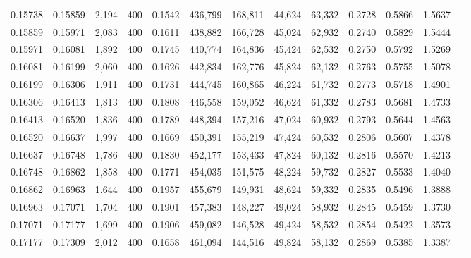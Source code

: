 \begin{tabular}{rrrrrrrrrrrrr}
0.15738 & 0.15859 &  2,194 & 400 &                                     0.1542 & 436,799 & 168,811 &  44,624 &  63,332 & 0.2728 & 0.5866 & 1.5637 \\
0.15859 & 0.15971 &  2,083 & 400 &                                     0.1611 & 438,882 & 166,728 &  45,024 &  62,932 & 0.2740 & 0.5829 & 1.5444 \\
0.15971 & 0.16081 &  1,892 & 400 &                                     0.1745 & 440,774 & 164,836 &  45,424 &  62,532 & 0.2750 & 0.5792 & 1.5269 \\
0.16081 & 0.16199 &  2,060 & 400 &                                     0.1626 & 442,834 & 162,776 &  45,824 &  62,132 & 0.2763 & 0.5755 & 1.5078 \\
0.16199 & 0.16306 &  1,911 & 400 &                                     0.1731 & 444,745 & 160,865 &  46,224 &  61,732 & 0.2773 & 0.5718 & 1.4901 \\
0.16306 & 0.16413 &  1,813 & 400 &                                     0.1808 & 446,558 & 159,052 &  46,624 &  61,332 & 0.2783 & 0.5681 & 1.4733 \\
0.16413 & 0.16520 &  1,836 & 400 &                                     0.1789 & 448,394 & 157,216 &  47,024 &  60,932 & 0.2793 & 0.5644 & 1.4563 \\
0.16520 & 0.16637 &  1,997 & 400 &                                     0.1669 & 450,391 & 155,219 &  47,424 &  60,532 & 0.2806 & 0.5607 & 1.4378 \\
0.16637 & 0.16748 &  1,786 & 400 &                                     0.1830 & 452,177 & 153,433 &  47,824 &  60,132 & 0.2816 & 0.5570 & 1.4213 \\
0.16748 & 0.16862 &  1,858 & 400 &                                     0.1771 & 454,035 & 151,575 &  48,224 &  59,732 & 0.2827 & 0.5533 & 1.4040 \\
0.16862 & 0.16963 &  1,644 & 400 &                                     0.1957 & 455,679 & 149,931 &  48,624 &  59,332 & 0.2835 & 0.5496 & 1.3888 \\
0.16963 & 0.17071 &  1,704 & 400 &                                     0.1901 & 457,383 & 148,227 &  49,024 &  58,932 & 0.2845 & 0.5459 & 1.3730 \\
0.17071 & 0.17177 &  1,699 & 400 &                                     0.1906 & 459,082 & 146,528 &  49,424 &  58,532 & 0.2854 & 0.5422 & 1.3573 \\
0.17177 & 0.17309 &  2,012 & 400 &                                     0.1658 & 461,094 & 144,516 &  49,824 &  58,132 & 0.2869 & 0.5385 & 1.3387 \\

\end{tabular}
